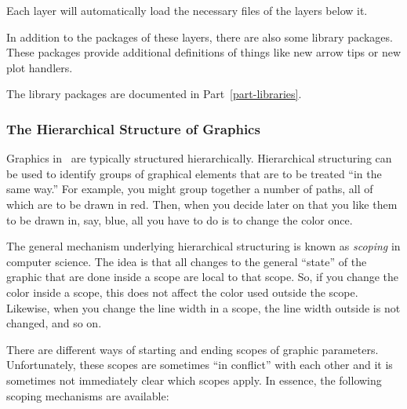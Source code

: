 Each layer will automatically load the necessary files of the layers below
it. 

In addition to the packages of these layers, there are also some
library packages. These packages provide additional definitions of
things like new arrow tips or new plot handlers.

The library packages are documented in Part~\ref{part-libraries}.




\subsubsection{The Hierarchical Structure of Graphics}

Graphics in \pgfname\ are typically structured
hierarchically. Hierarchical structuring can be used to identify
groups of graphical elements that are to be treated ``in the same
way.'' For example, you might group together a number of paths, all of
which are to be drawn in red. Then, when you decide later on that you
like them to be drawn in, say, blue, all you have to do is to change
the color once.

The general mechanism underlying hierarchical structuring is known as
\emph{scoping} in computer science. The idea is that all changes to
the general ``state'' of the graphic that are done inside a scope are
local to that scope. So, if you change the color inside a scope, this
does not affect the color used outside the scope. Likewise, when you
change the line width in a scope, the line width outside is not
changed, and so on.

There are different ways of starting and ending scopes of graphic
parameters. Unfortunately, these scopes are sometimes ``in conflict''
with each other and it is sometimes not immediately clear which scopes
apply. In essence, the following scoping mechanisms are available:

